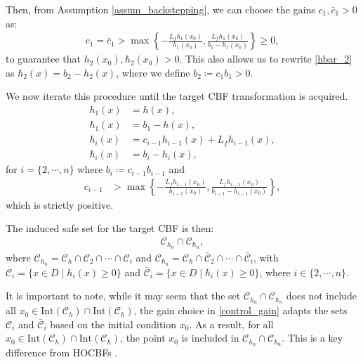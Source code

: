 \documentclass[letterpaper, 10 pt, conference]{ieeeconf}
\begin{document}
Then, from Assumption \ref{assum_backstepping}, we can choose the gains $c_1,\bar{c}_1 > 0$ as:
\begin{align}
    c_1 = \bar{c}_1 > \max\left\{ -\frac{L_fh_1(x_0)}{h_1(x_0)}, \frac{L_fh_1(x_0)}{b_1 - h_1(x_0)}\right\} \geq 0,
\end{align}
to guarantee that $h_2(x_0), \hbar_2(x_0) > 0$. This also allows us to rewrite \eqref{hbar_2} as $\hbar_2(x) = b_2 - h_2(x)$, where we define $b_2 \coloneqq c_1b_1 > 0$.

We now iterate this procedure until the target CBF transformation is acquired.
\begin{align}
    h_1(x) &= h(x),\label{cbf_chain_start}\\
    \hbar_1(x) &= b_1 - h(x),\\
    h_i(x) &= c_{i-1}h_{i-1}(x) + L_fh_{i-1}(x),\label{hi}\\
    \hbar_i(x) &= b_i - h_{i}(x),\label{hbari}
\end{align}
for $i = \{2, \cdots, n\}$ where $b_i \coloneqq c_{i-1}b_{i - 1}$ and
\begin{align}
    c_{i-1} &> \max\left\{ -\frac{L_fh_{i-1}(x_0)}{h_{i-1}(x_0)}, \frac{L_fh_{i-1}(x_0)}{b_{i-1} - h_{i-1}(x_0)}\right\}\label{control_gain},
\end{align}
which is strictly positive.

The induced safe set for the target CBF is then:
\begin{align}
    \mathcal{C}_{h_n} \cap \mathcal{C}_{\hbar_n},\label{safe_set_induced}
\end{align} 
where $\mathcal{C}_{h_n} = \mathcal{C}_h \cap \mathcal{C}_2 \cap \cdots \cap \mathcal{C}_i$ and $\mathcal{C}_{\hbar_n} = \mathcal{C}_\hbar \cap \bar{\mathcal{C}}_2 \cap \cdots \cap \bar{\mathcal{C}}_i$, with $\mathcal{C}_i = \{x \in D \mid h_i(x) \geq 0\}$ and $\bar{\mathcal{C}}_i = \{x \in D \mid \hbar_i(x) \geq 0\}$, where $i \in \{2,\cdots,n\}$. 

It is important to note, while it may seem that the set $\mathcal{C}_{h_n}\cap\mathcal{C}_{\hbar_n}$ does not include all $x_0 \in \text{Int}(\mathcal{C}_h) \cap \text{Int}(\mathcal{C}_\hbar)$, the gain choice in \eqref{control_gain} adapts the sets $\mathcal{C}_i$ and $\bar{\mathcal{C}}_i$ based on the initial condition $x_0$. As a result, for all $x_0 \in \text{Int}(\mathcal{C}_h) \cap \text{Int}(\mathcal{C}_\hbar)$, the point $x_0$ is included in $\mathcal{C}_{h_n} \cap \mathcal{C}_{\hbar_n}$. This is a key difference from HOCBFs \cite{xiao_hocbf}.
\end{document}
